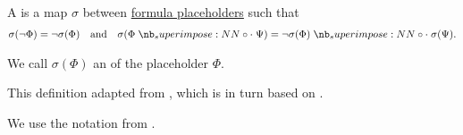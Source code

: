 \begin{definition}\label{def:uniform_placeholder_substitution}\mimprovised
  A  is a map \( \sigma \) between \hyperref[def:formula_placeholder]{formula placeholders} such that
  \begin{align*}
    \sigma(\neg \Phi) = \neg \sigma(\Phi) &&\T{and}&& \sigma(\Phi \syncirc \Psi) = \neg \sigma(\Phi) \syncirc \sigma(\Psi).
  \end{align*}

  We call \( \sigma(\Phi) \) an  of the placeholder \( \Phi \).
\end{definition}
\begin{comments}
  \item This definition adapted from , which is in turn based on \cite[def. 3.1.3]{CitkinMuravitsky2021}.
  \item We use the notation from .
\end{comments}

